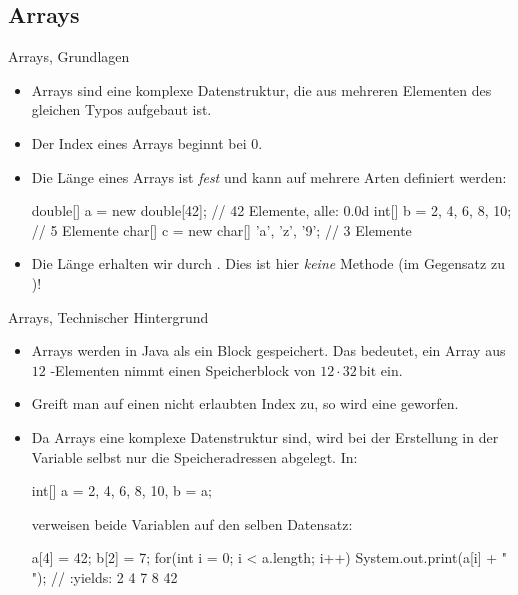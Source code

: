 \subsection{Arrays}
\begin{frame}[fragile]{Arrays, Grundlagen}
    \begin{itemize}[<+(1)->]
        \widei
        \item Arrays sind eine komplexe Datenstruktur,\pause{} die aus mehreren Elementen des gleichen Typos aufgebaut ist.
        \item Der Index eines Arrays beginnt bei \(0\).
        \item Die Länge eines Arrays ist \emph{fest}\pause{} und kann auf mehrere Arten definiert werden:\pause{}
\begin{plainjava}
double[] a = new double[42]; // 42 Elemente, alle: 0.0d
int[] b = {2, 4, 6, 8, 10}; // 5 Elemente
char[] c = new char[] {'a', 'z', '9'}; // 3 Elemente
\end{plainjava}
        \item Die Länge erhalten wir durch .\pause{} Dies ist hier \emph{keine} Methode (im Gegensatz zu )!
    \end{itemize}
\end{frame}

\begin{frame}[fragile]{Arrays, Technischer Hintergrund}
    \begin{itemize}[<+(1)->]
        \widei
        \item Arrays werden in Java als ein Block gespeichert.\pause{} Das bedeutet, ein Array aus \(12\) -Elementen nimmt einen Speicherblock von \(12 \cdot 32\,\text{bit}\) ein.
        \item Greift man auf einen nicht erlaubten Index zu,\pause{} so wird eine  geworfen.
        \item Da Arrays eine komplexe Datenstruktur sind, wird bei der Erstellung in der Variable selbst nur die Speicheradressen abgelegt.\pause{} In:\pause{}
\begin{plainjava}
int[] a = {2, 4, 6, 8, 10}, b = a;
\end{plainjava}
        \pause{}verweisen beide Variablen auf den selben Datensatz:\pause{}
\begin{plainjava}
a[4] = 42; b[2] = 7;
for(int i = 0; i < a.length; i++)
    System.out.print(a[i] + " "); // :yields: 2 4 7 8 42
\end{plainjava}
    \end{itemize}
\end{frame}

